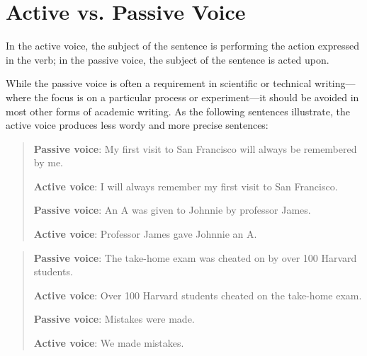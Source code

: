 
\chapter{Active vs. Passive Voice}



In the active voice, the subject of the sentence is performing the action expressed in the verb; in the passive voice, the subject of the sentence is acted upon. 

While the passive voice is often a requirement in scientific or technical writing---where the focus is on a particular process or experiment---it should be avoided in most other forms of academic writing. As the following sentences illustrate, the active voice produces less wordy and more precise sentences:

\begin{quote}
 
\textbf{Passive voice}: My first visit to San Francisco will always be remembered by me.

\textbf{Active voice}: I will always remember my first visit to San Francisco.

\textbf{Passive voice}: 	An A was given to Johnnie by professor James.

\textbf{Active voice}: 	Professor James gave Johnnie an A.
\end{quote}

\begin{quote}
\textbf{Passive voice}: The take-home exam was cheated on by over 100 Harvard students.

\textbf{Active voice}: Over 100 Harvard students cheated on the take-home exam.

\textbf{Passive voice}: Mistakes were made.

\textbf{Active voice}: We made mistakes.

\end{quote}

